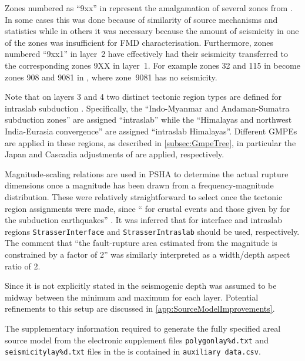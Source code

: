 \documentclass{article}
\begin{document}
Zones numbered as ``9xx'' in \cite{nath2012probabilistic} represent the amalgamation of several zones from \cite{thingbaijam2011seismogenic}.
In some cases this was done because of similarity of source mechanisms and statistics while in others it was necessary because the amount of seismicity in one of the zones was insufficient for FMD characterisation.
Furthermore, zones numbered ``9xx1'' in layer~2 have effectively had their seismicity transferred to the corresponding zones 9XX in layer~1.
For example zones 32 and 115 in \cite{thingbaijam2011seismogenic} become zones 908 and 9081 in \cite{nath2012probabilistic}, where zone~9081 has no seismicity.

Note that on layers 3 and 4 two distinct tectonic region types are defined for intraslab subduction \citep[p.
137]{nath2012probabilistic}.
Specifically, the ``Indo-Myanmar and Andaman-Sumatra subduction zones'' are assigned ``intraslab'' while the ``Himalayas and northwest India-Eurasia convergence'' are assigned ``intraslab Himalayas''.
Different GMPEs are applied in these regions, as described in \autoref{subsec:GmpeTree}, in particular the Japan and Cascadia adjustments of \cite{atkinson2003empirical} are applied, respectively.

Magnitude-scaling relations are used in PSHA to determine the actual rupture dimensions once a magnitude has been drawn from a frequency-magnitude distribution.
These were relatively straightforward to select once the tectonic region assignments were made, since ``\cite{wells1994new} for crustal events and those given by \cite{strasser2010scaling} for the subduction earthquakes'' \citep[p.~140]{nath2012probabilistic}.
It was inferred that for interface and intraslab regions \texttt{StrasserInterface} and \texttt{StrasserIntraslab} should be used, respectively.
The comment that ``the fault-rupture area estimated from the magnitude is constrained by a factor of 2'' \citep[p.~140]{nath2012probabilistic} was similarly interpreted as a width/depth aspect ratio of 2.

Since it is not explicitly stated in \cite{nath2012probabilistic} the seismogenic depth was assumed to be midway between the minimum and maximum for each layer.
Potential refinements to this setup are discussed in \autoref{app:SourceModelImprovements}.

The supplementary information required to generate the fully specified areal source model from the electronic supplement files \texttt{polygonlay\%d.txt} and \texttt{seismicitylay\%d.txt} files in the is contained in \texttt{auxiliary data.csv}.
\end{document}
